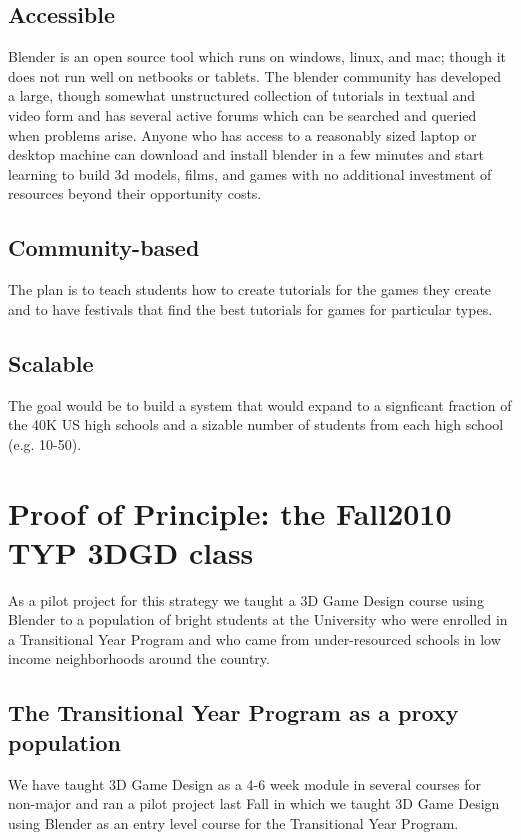 \documentclass{sig-alternate}
\begin{document}
\subsection{Accessible} Blender is an open source tool which runs on windows, linux, and mac; though it does not run well on netbooks or tablets.  The blender community has developed a large, though somewhat unstructured collection of tutorials in textual and video form and has several active forums which can be searched and queried when problems arise. Anyone who has access to a reasonably sized laptop or desktop machine can download and install blender in a few minutes and start learning to build 3d models, films, and games with no additional investment of resources beyond their opportunity costs.


\subsection{Community-based}
The plan is to teach students how to create tutorials for the games they create and to
have festivals that find the best tutorials for games for particular types.  


\subsection{Scalable}
The goal would be to build a system that would expand to a signficant fraction of the 40K US high
schools and a sizable number of students from each high school (e.g. 10-50). 



\section{Proof of Principle: the Fall2010 TYP 3DGD class}
As a pilot project for this strategy we taught a 3D Game Design course using Blender to a population
of bright students at the University who were enrolled in a Transitional Year Program and who came
from under-resourced schools in low income neighborhoods around the country.

\subsection{The Transitional Year Program as a proxy population}

We have taught 3D Game Design as a 4-6 week module in several courses for non-major and ran
a pilot project last Fall in which we taught 3D Game Design using Blender as an entry level course
for the Transitional Year Program.
\end{document}
